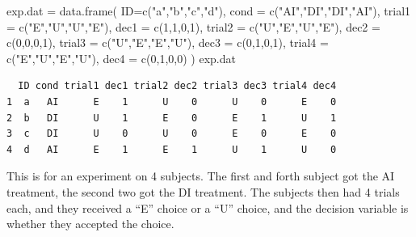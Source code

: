 \documentclass[
  letterpaper,
  DIV=11,
  numbers=noendperiod]{scrreprt}
\newenvironment{Shaded}{}{}
\newcommand{\AttributeTok}[1]{\textcolor[rgb]{0.49,0.56,0.16}{#1}}
\newcommand{\DecValTok}[1]{\textcolor[rgb]{0.25,0.63,0.44}{#1}}
\newcommand{\FunctionTok}[1]{\textcolor[rgb]{0.02,0.16,0.49}{#1}}
\newcommand{\NormalTok}[1]{#1}
\newcommand{\OtherTok}[1]{\textcolor[rgb]{0.00,0.44,0.13}{#1}}
\newcommand{\StringTok}[1]{\textcolor[rgb]{0.25,0.44,0.63}{#1}}
\begin{document}
\begin{Shaded}
\begin{Highlighting}[]
\NormalTok{exp.dat }\OtherTok{=} \FunctionTok{data.frame}\NormalTok{( }\AttributeTok{ID=}\FunctionTok{c}\NormalTok{(}\StringTok{"a"}\NormalTok{,}\StringTok{"b"}\NormalTok{,}\StringTok{"c"}\NormalTok{,}\StringTok{"d"}\NormalTok{), }
      \AttributeTok{cond =} \FunctionTok{c}\NormalTok{(}\StringTok{"AI"}\NormalTok{,}\StringTok{"DI"}\NormalTok{,}\StringTok{"DI"}\NormalTok{,}\StringTok{"AI"}\NormalTok{),}
            \AttributeTok{trial1 =} \FunctionTok{c}\NormalTok{(}\StringTok{"E"}\NormalTok{,}\StringTok{"U"}\NormalTok{,}\StringTok{"U"}\NormalTok{,}\StringTok{"E"}\NormalTok{),}
            \AttributeTok{dec1 =} \FunctionTok{c}\NormalTok{(}\DecValTok{1}\NormalTok{,}\DecValTok{1}\NormalTok{,}\DecValTok{0}\NormalTok{,}\DecValTok{1}\NormalTok{),}
            \AttributeTok{trial2 =} \FunctionTok{c}\NormalTok{(}\StringTok{"U"}\NormalTok{,}\StringTok{"E"}\NormalTok{,}\StringTok{"U"}\NormalTok{,}\StringTok{"E"}\NormalTok{),}
            \AttributeTok{dec2 =} \FunctionTok{c}\NormalTok{(}\DecValTok{0}\NormalTok{,}\DecValTok{0}\NormalTok{,}\DecValTok{0}\NormalTok{,}\DecValTok{1}\NormalTok{),}
                \AttributeTok{trial3 =} \FunctionTok{c}\NormalTok{(}\StringTok{"U"}\NormalTok{,}\StringTok{"E"}\NormalTok{,}\StringTok{"E"}\NormalTok{,}\StringTok{"U"}\NormalTok{),}
            \AttributeTok{dec3 =} \FunctionTok{c}\NormalTok{(}\DecValTok{0}\NormalTok{,}\DecValTok{1}\NormalTok{,}\DecValTok{0}\NormalTok{,}\DecValTok{1}\NormalTok{),}
                \AttributeTok{trial4 =} \FunctionTok{c}\NormalTok{(}\StringTok{"E"}\NormalTok{,}\StringTok{"U"}\NormalTok{,}\StringTok{"E"}\NormalTok{,}\StringTok{"U"}\NormalTok{),}
            \AttributeTok{dec4 =} \FunctionTok{c}\NormalTok{(}\DecValTok{0}\NormalTok{,}\DecValTok{1}\NormalTok{,}\DecValTok{0}\NormalTok{,}\DecValTok{0}\NormalTok{) )}
\NormalTok{exp.dat  }
\end{Highlighting}
\end{Shaded}

\begin{verbatim}
  ID cond trial1 dec1 trial2 dec2 trial3 dec3 trial4 dec4
1  a   AI      E    1      U    0      U    0      E    0
2  b   DI      U    1      E    0      E    1      U    1
3  c   DI      U    0      U    0      E    0      E    0
4  d   AI      E    1      E    1      U    1      U    0
\end{verbatim}

This is for an experiment on 4 subjects. The first and forth subject got
the AI treatment, the second two got the DI treatment. The subjects then
had 4 trials each, and they received a ``E'' choice or a ``U'' choice,
and the decision variable is whether they accepted the choice.
\end{document}
